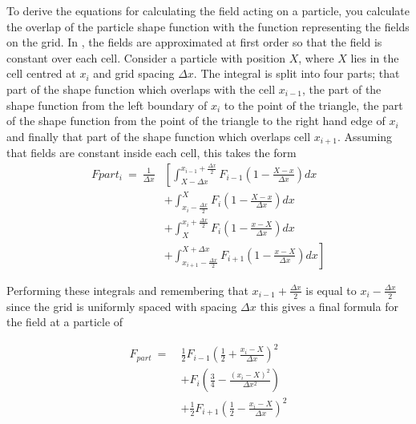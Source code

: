 \documentclass[12pt,a4paper]{article}
\newcommand{\inlinecode}[1]{{\color{warwickred} \bf\texttt{#1}}}
\newcommand{\EPOCH}{{\color{warwickdark}\fontfamily{phv}\selectfont{EPOCH}}}
\begin{document}
To derive the equations for calculating the field acting on a particle,
you calculate the overlap of the particle shape function with the function
representing the fields on the grid. In {\EPOCH}, the fields are approximated at
first order so that the field is constant over each cell. Consider a particle
with position $X$, where $X$ lies in the cell centred at $x_i$ and grid
spacing $\Delta x$. The integral is split into four parts; that part of the
shape function which overlaps with the cell $x_{i-1}$, the part of the shape
function from the left boundary of $x_i$ to the point of the triangle, the part
of the shape function from the point of the triangle to the right hand edge of
$x_i$ and finally that part of the shape function which overlaps cell
$x_{i+1}$. Assuming that fields are constant inside each cell, this takes the
form
\[
\begin{aligned}
  Fpart_i~=~\frac{1}{\Delta x} & \left[ \int^{x_{i-1}
      + \frac{\Delta x}{2}}_{X-\Delta x}
      F_{i-1} \left( 1-\frac{X-x}{\Delta x} \right) dx \right.\\
    & + \int^{X}_{x_i-\frac{\Delta x}{2}}
      F_i \left( 1-\frac{X-x}{\Delta x} \right) dx \\
    & + \int^{x_i+\frac{\Delta x}{2}}_{X}
      F_i \left(  1-\frac{x-X}{\Delta x}\right) dx \\
    & \left. + \int^{X+\Delta x}_{x_{i+1} - \frac{\Delta x}{2}}
      F_{i+1} \left( 1-\frac{x-X}{\Delta x}\right) dx\right]
\end{aligned}
\]

Performing these integrals and remembering that $x_{i-1}+\frac{\Delta x}{2}$ is
equal to $x_i-\frac{\Delta x}{2}$ since the grid is uniformly spaced with
spacing $\Delta x$ this gives a final formula for the field at a particle of

\[
\begin{aligned}
  F_{part}~=~& \frac{1}{2} F_{i-1} \left( \frac{1}{2}
  + \frac{x_i-X}{\Delta x} \right)^2 \\
  & + F_i \left( \frac{3}{4} - \frac{(x_i-X)^2}{\Delta x^2} \right)\\
  & +\frac{1}{2} F_{i+1} \left( \frac{1}{2} - \frac{x_i-X}{\Delta x} \right)^2
\end{aligned}
\]

\end{document}
